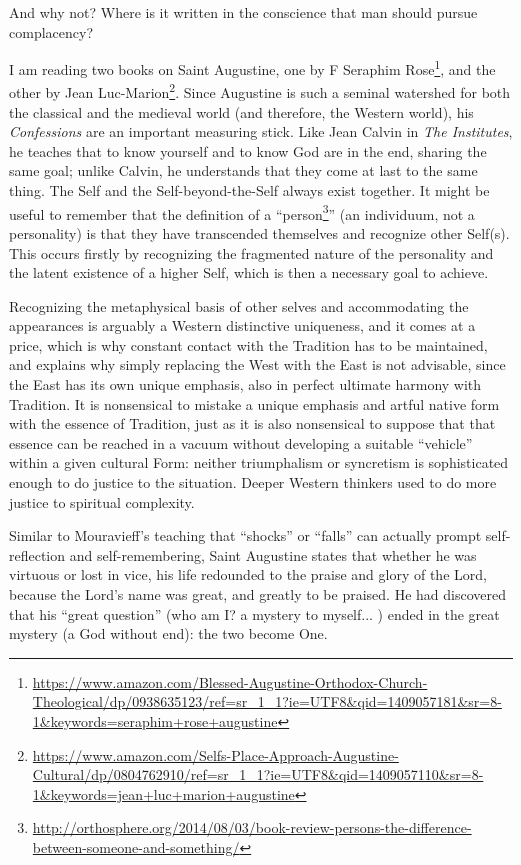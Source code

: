And why not? Where is it written in the conscience that man should pursue complacency?

I am reading two books on Saint Augustine, one by F Seraphim Rose\footnote{\url{https://www.amazon.com/Blessed-Augustine-Orthodox-Church-Theological/dp/0938635123/ref=sr\_1\_1?ie=UTF8\&qid=1409057181\&sr=8-1\&keywords=seraphim+rose+augustine}}, and the other by Jean Luc-Marion\footnote{\url{https://www.amazon.com/Selfs-Place-Approach-Augustine-Cultural/dp/0804762910/ref=sr\_1\_1?ie=UTF8\&qid=1409057110\&sr=8-1\&keywords=jean+luc+marion+augustine}}. Since Augustine is such a seminal watershed for both the classical and the medieval world (and therefore, the Western world), his \emph{Confessions} are an important measuring stick. Like Jean Calvin in \emph{The Institutes}, he teaches that to know yourself and to know God are in the end, sharing the same goal; unlike Calvin, he understands that they come at last to the same thing. The Self and the Self-beyond-the-Self always exist together. It might be useful to remember that the definition of a ``person\footnote{\url{http://orthosphere.org/2014/08/03/book-review-persons-the-difference-between-someone-and-something/}}'' (an individuum, not a personality) is that they have transcended themselves and recognize other Self(s). This occurs firstly by recognizing the fragmented nature of the personality and the latent existence of a higher Self, which is then a necessary goal to achieve.

Recognizing the metaphysical basis of other selves and accommodating the appearances is arguably a Western distinctive uniqueness, and it comes at a price, which is why constant contact with the Tradition has to be maintained, and explains why simply replacing the West with the East is not advisable, since the East has its own unique emphasis, also in perfect ultimate harmony with Tradition. It is nonsensical to mistake a unique emphasis and artful native form with the essence of Tradition, just as it is also nonsensical to suppose that that essence can be reached in a vacuum without developing a suitable ``vehicle'' within a given cultural Form: neither triumphalism or syncretism is sophisticated enough to do justice to the situation. Deeper Western thinkers used to do more justice to spiritual complexity.

Similar to Mouravieff's teaching that ``shocks'' or ``falls'' can actually prompt self-reflection and self-remembering, Saint Augustine states that whether he was virtuous or lost in vice, his life redounded to the praise and glory of the Lord, because the Lord's name was great, and greatly to be praised. He had discovered that his ``great question'' (who am I? a mystery to myself... ) ended in the great mystery (a God without end): the two become One.

